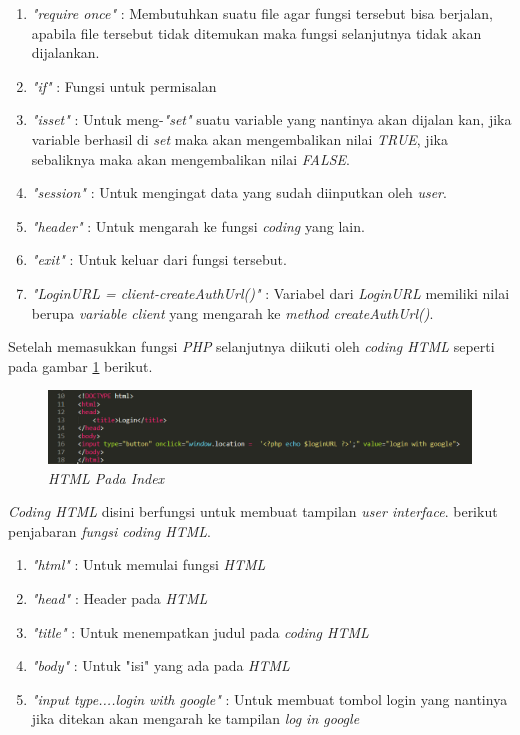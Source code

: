 \begin{enumerate}
\item \textit{"require once"} : Membutuhkan suatu file agar fungsi tersebut bisa berjalan, apabila file tersebut tidak ditemukan maka fungsi selanjutnya tidak akan dijalankan.
\item \textit{"if"} : Fungsi untuk permisalan
\item \textit{"isset"} : Untuk meng-\textit{"set"} suatu variable yang nantinya akan dijalan kan, jika variable berhasil di \textit{set} maka akan mengembalikan nilai \textit{TRUE}, jika sebaliknya maka akan mengembalikan nilai \textit{FALSE}.
\item \textit{"session" }: Untuk mengingat data yang sudah diinputkan oleh \textit{user}.
\item \textit{"header" }: Untuk mengarah ke fungsi \textit{coding} yang lain.
\item \textit{"exit" }: Untuk keluar dari fungsi tersebut.
\item \textit{"LoginURL = client-createAuthUrl()" }: Variabel dari \textit{LoginURL} memiliki nilai berupa \textit{variable client} yang mengarah ke \textit{method createAuthUrl()}.
\end{enumerate}


\par 
Setelah memasukkan fungsi \textit{PHP} selanjutnya diikuti oleh \textit{coding HTML} seperti pada gambar \ref{indexhtml} berikut.

\begin{figure}[!htbp]
    \centering
    \includegraphics[scale=0.5]{gambar/indexhtml}
    \caption{\textit{HTML Pada Index}}
    \label{indexhtml}
\end{figure}
\par 
\textit{Coding HTML} disini berfungsi untuk membuat tampilan \textit{user interface}. berikut penjabaran \textit{fungsi coding HTML}.
\begin{enumerate}
\item \textit{"html"} : Untuk memulai fungsi \textit{HTML}
\item \textit{"head"} : Header pada \textit{HTML}
\item \textit{"title"} : Untuk menempatkan judul pada \textit{coding HTML}
\item \textit{"body"} : Untuk "isi" yang ada pada \textit{HTML}
\item \textit{"input type....login with google"} : Untuk membuat tombol login yang nantinya jika ditekan akan mengarah ke tampilan \textit{ log in google}
\end{enumerate}

